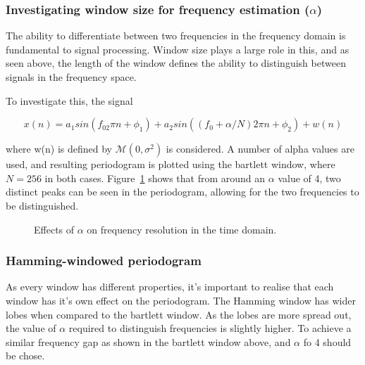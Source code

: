\documentclass[main.tex]{subfiles}
\begin{document}




\subsubsection{Investigating window size for frequency estimation ($\alpha$)}

The ability to differentiate between two frequencies in the frequency domain is fundamental to signal processing. Window size plays a large role in this, and as seen above, the length of the window defines the ability to distinguish between signals in the frequency space.

To investigate this, the signal 

\begin{equation}
x(n) = a_1sin(f_02\pi n + \phi_1) + a_2sin((f_0+\alpha/N)2\pi n + \phi_2) + w(n)
\end{equation}

where w(n) is defined by $\mathcal{M}(0, \sigma^2)$ is considered. A number of alpha values are used, and resulting periodogram is plotted using the bartlett window, where $N=256$ in both cases. Figure~\ref{fig:q1_3_b} shows that from around an $\alpha$ value of 4, two distinct peaks can be seen in the periodogram, allowing for the two frequencies to be distinguished.


\begin{figure}[H]
	\centering 
	\resizebox{\textwidth}{!}{}
	\caption{Effects of $\alpha$ on frequency resolution in the time domain.}
	\label{fig:q1_3_b}
\end{figure}




\subsubsection{Hamming-windowed periodogram}

As every window has different properties, it's important to realise that each window has it's own effect on the periodogram. The Hamming window has wider lobes when compared to the bartlett window. As the lobes are more spread out, the value of $\alpha$ required to distinguish frequencies is slightly higher. To achieve a similar frequency gap as shown in the bartlett window above, and $\alpha$ fo 4 should be chose.  %
\end{document}
